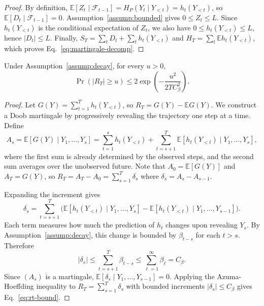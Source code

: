 \documentclass{llmxive}
\begin{document}
\begin{proof}
By definition,
$\mathbb{E}[Z_t\mid \mathcal{F}_{t-1}] = H_P(Y_t\mid Y_{<t}) = h_t(Y_{<t})$,
so $\mathbb{E}[D_t\mid\mathcal{F}_{t-1}]=0$. Assumption~\ref{assump:bounded} gives $0\le Z_t\le L$. Since $h_t(Y_{<t})$ is the conditional expectation of $Z_t$, we also have $0\le h_t(Y_{<t})\le L$, hence $|D_t|\le L$. Finally, $S_T=\sum_t D_t + \sum_t h_t(Y_{<t})$ and $H_T=\sum_t\mathbb{E}h_t(Y_{<t})$, which proves Eq.~\eqref{eq:martingale-decomp}.
\end{proof}

\begin{lemma}[Concentration of $R_T$]
\label{lem:rt}
Under Assumption~\ref{assump:decay}, for every $u>0$,
\begin{equation}
  \Pr(|R_T|\ge u)
  \le 2\exp\!\left(-\frac{u^2}{2TC_\beta^2}\right).
  \label{eq:rt-bound}
\end{equation}
\end{lemma}

\begin{proof}
Let $G(Y)=\sum_{t=1}^{T}h_t(Y_{<t})$, so $R_T=G(Y)-\mathbb{E}G(Y)$. We construct a Doob martingale by progressively revealing the trajectory one step at a time. Define
\begin{equation}
  A_s=\mathbb{E}[G(Y)\mid Y_1,\dots,Y_s]
  = \sum_{t=1}^{s} h_t(Y_{<t}) + \sum_{t=s+1}^{T} \mathbb{E}[h_t(Y_{<t})\mid Y_1,\dots,Y_s],
\end{equation}
where the first sum is already determined by the observed steps, and the second sum averages over the unobserved future. Note that $A_0 = \mathbb{E}[G(Y)]$ and $A_T = G(Y)$, so $R_T = A_T - A_0 = \sum_{s=1}^{T}\delta_s$ where $\delta_s = A_s - A_{s-1}$.

Expanding the increment gives
\begin{equation}
  \delta_s = \sum_{t=s+1}^{T}\Big(\mathbb{E}[h_t(Y_{<t})\mid Y_1,\dots,Y_s] - \mathbb{E}[h_t(Y_{<t})\mid Y_1,\dots,Y_{s-1}]\Big).
\end{equation}
Each term measures how much the prediction of $h_t$ changes upon revealing $Y_s$. By Assumption~\ref{assump:decay}, this change is bounded by $\beta_{t-s}$ for each $t>s$. Therefore
\begin{equation}
  |\delta_s|\le \sum_{t=s+1}^{T}\beta_{t-s}\le \sum_{\ell=1}^{\infty}\beta_\ell = C_\beta.
\end{equation}
Since $(A_s)$ is a martingale, $\mathbb{E}[\delta_s\mid Y_1,\dots,Y_{s-1}]=0$. Applying the Azuma-Hoeffding inequality to $R_T=\sum_{s=1}^{T}\delta_s$ with bounded increments $|\delta_s|\le C_\beta$ gives Eq.~\eqref{eq:rt-bound}.
\end{proof}
\end{document}
